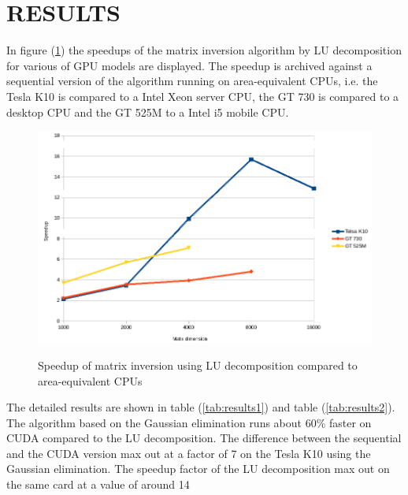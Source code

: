 
\section{RESULTS}\label{sec:results}
In figure (\ref{fig:speedup}) the speedups of the matrix inversion algorithm by LU decomposition for various of GPU models are displayed. The speedup is archived against a sequential version of the algorithm running on area-equivalent CPUs, i.e. the Tesla K10 is compared to a Intel Xeon server CPU, the GT 730 is compared to a desktop CPU and the GT 525M to a Intel i5 mobile CPU. 
\begin{figure}
	\includegraphics[width=18cm]{figs/speedup.png}
	\centering
	\label{fig:speedup}
	\caption{Speedup of matrix inversion using LU decomposition compared to area-equivalent CPUs}
\end{figure}

The detailed results are shown in table (\ref{tab:results1}) and table (\ref{tab:results2}).
The algorithm based on the Gaussian elimination runs about 60\% faster on CUDA compared to the LU decomposition. The difference between the sequential and the CUDA version max out at a factor of 7 on the Tesla K10 using the Gaussian elimination. The speedup factor of the LU decomposition max out on the same card at a value of around 14

